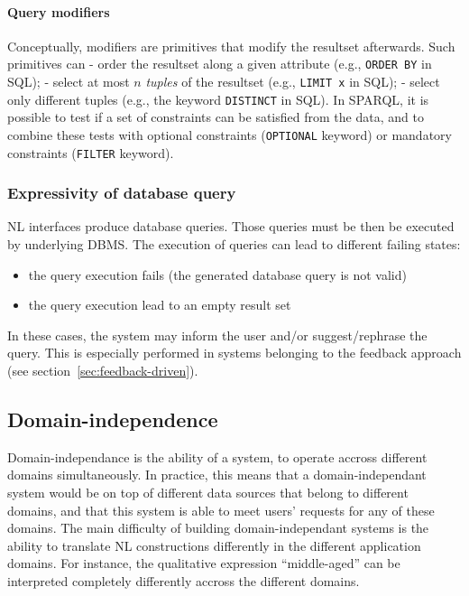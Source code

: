 \documentclass[10pt,journal,letterpaper,compsoc]{IEEEtran}
\begin{document}
\paragraph{Query modifiers}
\label{sec:query-languages-modifiers}
Conceptually, modifiers are primitives that modify the resultset afterwards.
Such primitives can - order the resultset along a given attribute (e.g.,
\verb?ORDER BY? in SQL); - select at most $n$ \emph{tuples} of the resultset
(e.g., \verb?LIMIT x? in SQL); - select only different tuples (e.g., the
keyword \verb?DISTINCT? in SQL).
In SPARQL, it is possible to test if a set of constraints can be satisfied from
the data, and to combine these tests with optional constraints (\verb?OPTIONAL?
keyword) or mandatory constraints (\verb?FILTER? keyword).





\subsubsection{Expressivity of database query}
\label{sec:big-picture-expressivity}




NL interfaces produce database queries.
Those queries must be then be executed by underlying DBMS.
The execution of queries can lead to different failing states:
\begin{itemize}
  \item the query execution fails (the generated database query is not valid)
  \item the query execution lead to an empty result set
\end{itemize}
In these cases, the system may inform the user and/or suggest/rephrase the
query. This is especially performed in systems belonging to the feedback
approach (see section~\ref{sec:feedback-driven}). 


\subsection{Domain-independence}
\label{sec:main-dimensions-domain-independance}
Domain-independance is the ability of a system, to operate accross different
domains simultaneously. 
In practice, this means that a domain-independant system would be on top of
different data sources that belong to different domains, and that this system is
able to meet users' requests for any of these domains. 
The main difficulty of building domain-independant systems is the ability to
translate NL constructions differently in the different application domains.
For instance, the qualitative expression ``middle-aged'' can be interpreted
completely differently accross the different domains.
\end{document}
